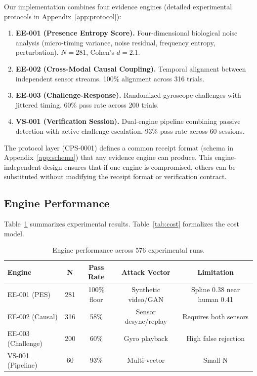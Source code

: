 \documentclass[conference]{IEEEtran}
\begin{document}
Our implementation combines four evidence engines (detailed experimental protocols in Appendix~\ref{app:protocol}):

\begin{enumerate}
\item \textbf{EE-001 (Presence Entropy Score).} Four-dimensional biological noise analysis (micro-timing variance, noise residual, frequency entropy, perturbation). $N = 281$, Cohen's $d = 2.1$.
\item \textbf{EE-002 (Cross-Modal Causal Coupling).} Temporal alignment between independent sensor streams. 100\% alignment across 316 trials.
\item \textbf{EE-003 (Challenge-Response).} Randomized gyroscope challenges with jittered timing. 60\% pass rate across 200 trials.
\item \textbf{VS-001 (Verification Session).} Dual-engine pipeline combining passive detection with active challenge escalation. 93\% pass rate across 60 sessions.
\end{enumerate}

The protocol layer (CPS-0001) defines a common receipt format (schema in Appendix~\ref{app:schema}) that any evidence engine can produce. This engine-independent design ensures that if one engine is compromised, others can be substituted without modifying the receipt format or verification contract.

\subsection{Engine Performance}

Table~\ref{tab:engines} summarizes experimental results. Table~\ref{tab:cost} formalizes the cost model.

\begin{table}[H]
\centering
\caption{Engine performance across 576 experimental runs.}
\label{tab:engines}
\begin{tabular}{lcccc}
\toprule
\textbf{Engine} & \textbf{N} & \textbf{Pass Rate} & \textbf{Attack Vector} & \textbf{Limitation} \\
\midrule
EE-001 (PES) & 281 & 100\% floor & Synthetic video/GAN & Spline 0.38 near human 0.41 \\
EE-002 (Causal) & 316 & 58\% & Sensor desync/replay & Requires both sensors \\
EE-003 (Challenge) & 200 & 60\% & Gyro playback & High false rejection \\
VS-001 (Pipeline) & 60 & 93\% & Multi-vector & Small N \\
\bottomrule
\end{tabular}
\end{table}
\end{document}
